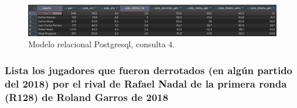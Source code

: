 \documentclass[11pt]{opticajnl}
\begin{document}
\begin{figure}[H]
\centering
\includegraphics[width=\textwidth]{fotos/q4_rel.png}
\caption{Modelo relacional Postgresql, consulta 4.}
\label{fig:q4_rel}
\end{figure}

\subsubsection{Lista los jugadores que fueron derrotados (en algún partido del 2018) por el rival de Rafael Nadal de la primera ronda (R128) de Roland Garros de 2018}
\end{document}
